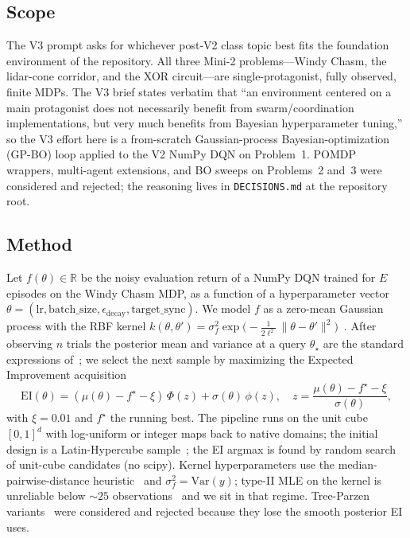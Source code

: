 \documentclass[11pt,letterpaper]{article}
\begin{document}
\subsection{Scope}
The V3 prompt asks for whichever post-V2 class topic best fits the foundation environment of the repository. All three Mini-2 problems---Windy Chasm, the lidar-cone corridor, and the XOR circuit---are single-protagonist, fully observed, finite MDPs. The V3 brief states verbatim that ``an environment centered on a main protagonist does not necessarily benefit from swarm/coordination implementations, but very much benefits from Bayesian hyperparameter tuning,'' so the V3 effort here is a from-scratch Gaussian-process Bayesian-optimization (GP-BO) loop applied to the V2 NumPy DQN on Problem~1. POMDP wrappers, multi-agent extensions, and BO sweeps on Problems~2 and~3 were considered and rejected; the reasoning lives in \texttt{DECISIONS.md} at the repository root.

\subsection{Method}
Let $f(\theta) \in \mathbb{R}$ be the noisy evaluation return of a NumPy DQN trained for $E$ episodes on the Windy Chasm MDP, as a function of a hyperparameter vector $\theta = (\mathrm{lr}, \mathrm{batch\_size}, \epsilon_{\mathrm{decay}}, \mathrm{target\_sync})$. We model $f$ as a zero-mean Gaussian process with the RBF kernel $k(\theta,\theta') = \sigma_f^2 \exp\!\big(\!-\tfrac{1}{2\ell^{2}}\,\|\theta-\theta'\|^{2}\big)$~\cite{rasmussen2006}. After observing $n$ trials the posterior mean and variance at a query $\theta_\star$ are the standard expressions of~\cite{rasmussen2006}; we select the next sample by maximizing the Expected Improvement acquisition~\cite{mockus1989}
\[
\mathrm{EI}(\theta) = (\mu(\theta) - f^{\star} - \xi)\,\Phi(z) + \sigma(\theta)\,\phi(z),
\quad z = \frac{\mu(\theta) - f^{\star} - \xi}{\sigma(\theta)},
\]
with $\xi = 0.01$ and $f^{\star}$ the running best. The pipeline runs on the unit cube $[0,1]^d$ with log-uniform or integer maps back to native domains; the initial design is a Latin-Hypercube sample~\cite{mckay1979}; the EI argmax is found by random search of unit-cube candidates (no scipy). Kernel hyperparameters use the median-pairwise-distance heuristic~\cite{garreau2018} and $\sigma_f^2 = \mathrm{Var}(y)$; type-II MLE on the kernel is unreliable below $\sim 25$ observations~\cite{snoek2012} and we sit in that regime. Tree-Parzen variants~\cite{bergstra2011} were considered and rejected because they lose the smooth posterior EI uses.
\end{document}
